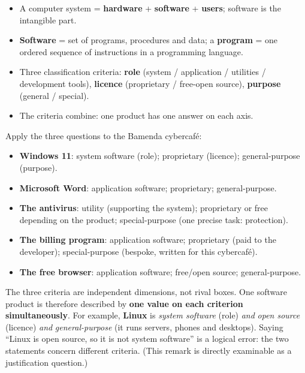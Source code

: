 \documentclass[11pt]{article}
\begin{document}
\begin{aretenir}
\begin{itemize}
\item A computer system = \textbf{hardware} + \textbf{software} + \textbf{users}; software is the intangible part.
\item \textbf{Software} = set of programs, procedures and data; a \textbf{program} = one ordered sequence of instructions in a programming language.
\item Three classification criteria: \textbf{role} (system / application / utilities / development tools), \textbf{licence} (proprietary / free-open source), \textbf{purpose} (general / special).
\item The criteria combine: one product has one answer on each axis.
\end{itemize}
\end{aretenir}

\begin{exemplebox}
Apply the three questions to the Bamenda cybercafé:
\begin{itemize}
\item \textbf{Windows 11}: system software (role); proprietary (licence); general-purpose (purpose).
\item \textbf{Microsoft Word}: application software; proprietary; general-purpose.
\item \textbf{The antivirus}: utility (supporting the system); proprietary or free depending on the product; special-purpose (one precise task: protection).
\item \textbf{The billing program}: application software; proprietary (paid to the developer); special-purpose (bespoke, written for this cybercafé).
\item \textbf{The free browser}: application software; free/open source; general-purpose.
\end{itemize}
\end{exemplebox}

\begin{propriete}
The three criteria are independent dimensions, not rival boxes. One software product is therefore described by \textbf{one value on each criterion simultaneously}. For example, \textbf{Linux} is \emph{system software} (role) \emph{and} \emph{open source} (licence) \emph{and} \emph{general-purpose} (it runs servers, phones and desktops). Saying ``Linux is open source, so it is not system software'' is a logical error: the two statements concern different criteria. (This remark is directly examinable as a justification question.)
\end{propriete}
\end{document}

